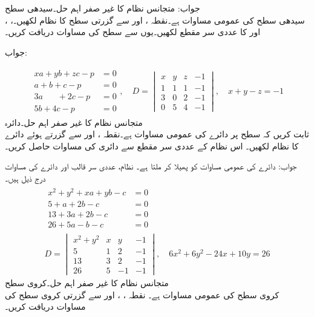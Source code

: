 جواب:  
\quad متجانس نظام کا غیر صفر اہم حل۔سیدھی سطح\\
سیدھی سطح کی عمومی مساوات  ہے۔نقطہ ،  اور  سے گزرتی سطح کا نظام لکھیں۔، ،  اور  کا عددی سر مقطع  لکھیں۔یوں  سے سطح کی مساوات دریافت کریں۔

جواب:

\begin{gather*}
\begin{aligned}
xa+yb+zc-p&=0\\
a+b+c-p&=0\\
3a\phantom{+yb}+2c-p&=0\\
5b+4c-p&=0
\end{aligned},\quad 
D=\begin{vmatrix}
x&y&z&-1\\ 1&1&1&-1\\3&0&2&-1\\0&5&4&-1
\end{vmatrix},\quad x+y-z=-1
\end{gather*}
\quad متجانس نظام کا غیر صفر اہم حل۔دائرہ\\
ثابت کریں کہ  سطح پر دائرے کی عمومی مساوات  ہے۔نقطہ ،  اور  سے گزرتے ہوئے دائرے کا نظام لکھیں۔ اس نظام کے عددی سر مقطع سے دائری کی مساوات حاصل کریں۔ 




جواب: دائرے کی عمومی مساوات   کو پھیلا کر  ملتا ہے۔ نظام، عددی سر قالب اور دائرے کی مساوات درج ذیل ہیں۔
\begin{gather*}
\begin{aligned}
x^2+y^2+xa+yb-c&=0\\
5+a+2b-c&=0\\
13+3a+2b-c&=0\\
26+5a-b-c&=0
\end{aligned}\\ 
D=
\begin{vmatrix}
x^2+y^2&x&y&-1\\5&1&2&-1\\13&3&2&-1\\26&5&-1&-1
\end{vmatrix},\quad 
6x^2+6y^2-24x+10y=26
\end{gather*}
\quad متجانس نظام کا غیر صفر اہم حل۔کروی سطح\\
کروی سطح کی عمومی مساوات  ہے۔ نقطہ ، ،   اور  سے گزرتی کروی سطح کی مساوات دریافت کریں۔

